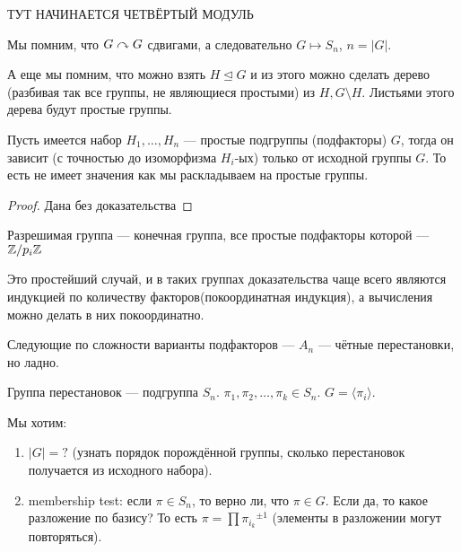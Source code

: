 {\Large \textsc{ТУТ НАЧИНАЕТСЯ ЧЕТВЁРТЫЙ МОДУЛЬ}}

Мы помним, что $G \curvearrowright G$ сдвигами, а следовательно  $G \mapsto S_n$,  $n = |G|$. 

А еще мы помним, что  можно взять $H \trianglelefteq G$ и из этого можно сделать дерево (разбивая так все группы, не являющиеся простыми) из $H, G \setminus H$. Листьями этого дерева будут простые группы. 

\begin{theorem}
    Пусть имеется набор $H_1, \ldots, H_n$ --- простые подгруппы (подфакторы) $G$, тогда он зависит (с точностью до изоморфизма $H_i$-ых) только от исходной группы $G$. То есть не имеет значения как мы раскладываем на простые группы.
\end{theorem}
\begin{proof}
	Дана без доказательства
\end{proof}
\begin{definition}
    Разрешимая группа --- конечная группа, все простые подфакторы которой --- $\mathbb{Z} / p_i \mathbb{Z}$
\end{definition}
Это простейший случай, и в таких группах доказательства чаще всего являются индукцией по количеству факторов(покоординатная индукция), а вычисления можно делать в них покоординатно. 

Следующие по сложности варианты подфакторов --- $A_n$ --- чётные перестановки, но ладно. 
\begin{definition}
    Группа перестановок --- подгруппа $S_n$.
     $\pi_1, \pi_2, \ldots, \pi_k \in S_n$. $G = \langle \pi_i \rangle$.
\end{definition}

Мы хотим:
\begin{enumerate}
    \item $|G| = ?$ (узнать порядок порождённой группы, сколько перестановок получается из исходного набора).
    \item membership test: если  $\pi \in S_n$, то верно ли, что  $\pi \in G$. Если да, то какое разложение по базису? То есть $\pi = \prod {\pi_{i_k}}^{\pm 1}$ (элементы в разложении могут повторяться).
\end{enumerate}

